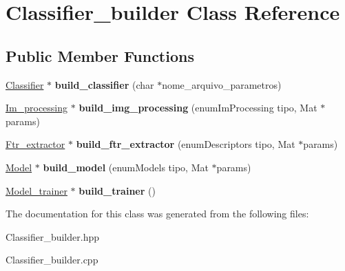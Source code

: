 \hypertarget{class_classifier__builder}{\section{Classifier\+\_\+builder Class Reference}
\label{class_classifier__builder}
}
\subsection*{Public Member Functions}
\begin{DoxyCompactItemize}
\item 
\hypertarget{class_classifier__builder_a9b6ef2588fe70aa48258b2f8f59d82f9}{\hyperlink{class_classifier}{Classifier} $\ast$ {\bfseries build\+\_\+classifier} (char $\ast$nome\+\_\+arquivo\+\_\+parametros)}\label{class_classifier__builder_a9b6ef2588fe70aa48258b2f8f59d82f9}

\item 
\hypertarget{class_classifier__builder_ad836ba2a05cc1ae0aaea279ff60fb0e7}{\hyperlink{class_im__processing}{Im\+\_\+processing} $\ast$ {\bfseries build\+\_\+img\+\_\+processing} (enum\+Im\+Processing tipo, Mat $\ast$params)}\label{class_classifier__builder_ad836ba2a05cc1ae0aaea279ff60fb0e7}

\item 
\hypertarget{class_classifier__builder_a45f684052b0a27dbb826bcab8265b32d}{\hyperlink{class_ftr__extractor}{Ftr\+\_\+extractor} $\ast$ {\bfseries build\+\_\+ftr\+\_\+extractor} (enum\+Descriptors tipo, Mat $\ast$params)}\label{class_classifier__builder_a45f684052b0a27dbb826bcab8265b32d}

\item 
\hypertarget{class_classifier__builder_a6080594fee5e01afe55d5c481c7a95ba}{\hyperlink{class_model}{Model} $\ast$ {\bfseries build\+\_\+model} (enum\+Models tipo, Mat $\ast$params)}\label{class_classifier__builder_a6080594fee5e01afe55d5c481c7a95ba}

\item 
\hypertarget{class_classifier__builder_a3efa3afcb9bdc6dc1a9771d82852120f}{\hyperlink{class_model__trainer}{Model\+\_\+trainer} $\ast$ {\bfseries build\+\_\+trainer} ()}\label{class_classifier__builder_a3efa3afcb9bdc6dc1a9771d82852120f}

\end{DoxyCompactItemize}


The documentation for this class was generated from the following files\+:\begin{DoxyCompactItemize}
\item 
Classifier\+\_\+builder.\+hpp\item 
Classifier\+\_\+builder.\+cpp\end{DoxyCompactItemize}
